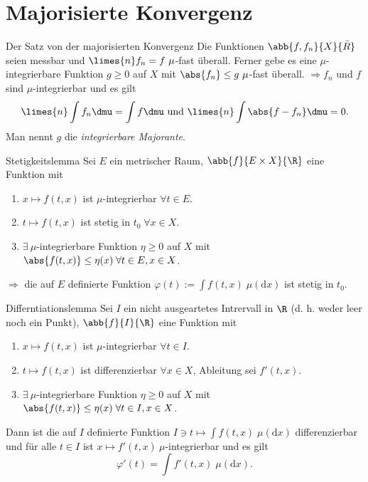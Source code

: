 \section*{Majorisierte Konvergenz}

\begin{karte}{Der Satz von der majorisierten Konvergenz}
	Die Funktionen \( \abb{f, f_n}{X}{\bar{R}} \) 
	seien messbar und \( \limes{n} f_n = f\ \mu \)-fast überall. 
	Ferner gebe es eine \(\mu\)-integrierbare Funktion 
	\( g \geq 0 \) auf \(X\) mit \( \abs{f_n} \leq g\ \mu \)-fast überall.
	\( \Rightarrow f_n \) und \(f\) sind \( \mu \)-integrierbar und es gilt 
	\[ \limes{n} \int f_n \dmu = \int f \dmu \text{ und } \limes{n} \int \abs{ f - f_n } \dmu = 0. \]
	Man nennt \(g\) die \textit{integrierbare Majorante}.
\end{karte}

\begin{karte}{Stetigkeitslemma}
	Sei \( E \) ein metrischer Raum, \( \abb{f}{E\times X}{\R} \) eine Funktion mit 
	\begin{enumerate}
		\item \( x\mapsto f(t,x) \) ist \(\mu\)-integrierbar \(\forall t\in E\).
		\item \( t\mapsto f(t,x) \) ist stetig in \(t_0 \;\forall x\in X\).
		\item \( \exists \ \mu \)-integrierbare Funktion 
		\( \eta \geq 0 \) auf \( X \) mit \( \abs{f(t,x)} \leq \eta(x) \;\forall t\in E, x\in X \).
	\end{enumerate}
	\( \Rightarrow \) die auf \(E\) definierte Funktion 
	\( \varphi(t) := \int f(t,x) \;\mu(\text{d}x) \) ist stetig in \( t_0 \).
\end{karte}

\begin{karte}{Differntiationslemma}
	Sei \(I\) ein nicht ausgeartetes Intrervall in \(\R\) (d. h. weder leer noch ein Punkt), 
	\( \abb{f}{I}{\R} \) eine Funktion mit 
	\begin{enumerate}
		\item \( x\mapsto f(t,x) \) ist \(\mu\)-integrierbar \(\forall t\in I\).
		\item \( t\mapsto f(t,x) \) ist differenzierbar \(\forall x\in X\), 
		Ableitung sei \(f'(t,x)\).
		\item \( \exists \ \mu \)-integrierbare Funktion 
		\( \eta \geq 0 \) auf \( X \) mit \( \abs{f(t,x)} \leq \eta(x) \;\forall t\in I, x\in X \).
	\end{enumerate}
	Dann ist die auf \(I\) definierte Funktion 
	\( I \ni t \mapsto \int f(t,x) \;\mu(\text{d}x) \) 
	differenzierbar und für alle \( t\in I \) 
	ist \( x \mapsto f'(t,x)\ \mu \)-integrierbar und
	es gilt 
	\[ \varphi'(t) = \int f'(t,x) \;\mu(\text{d}{x}). \]
\end{karte}